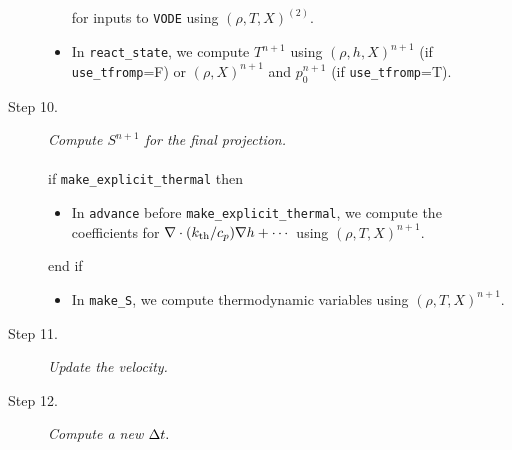 \begin{description}
\begin{itemize}
for inputs to {\tt VODE} using $(\rho,T,X)^{(2)}$.
\item In {\tt react\_state}, we compute $T^{n+1}$ using $(\rho,h,X)^{n+1}$ 
(if {\tt use\_tfromp}=F) or $(\rho,X)^{n+1}$ and $p_0^{n+1}$ (if {\tt use\_tfromp}=T).
\end{itemize}
\item[Step 10.] {\em Compute $S^{n+1}$ for the final projection.}\\ \\
if {\tt make\_explicit\_thermal} then
\begin{itemize}
\item In {\tt advance} before {\tt make\_explicit\_thermal}, we compute the coefficients for 
$\nabla\cdot(k_{\rm th}/c_p)\nabla h + \cdots$ using $(\rho,T,X)^{n+1}$.
\end{itemize}
end if
\begin{itemize}
\item In {\tt make\_S}, we compute thermodynamic variables using $(\rho,T,X)^{n+1}$.
\end{itemize}
\item[Step 11.] {\em Update the velocity.}
\item[Step 12.] {\em Compute a new $\Delta t.$}
\end{description}

